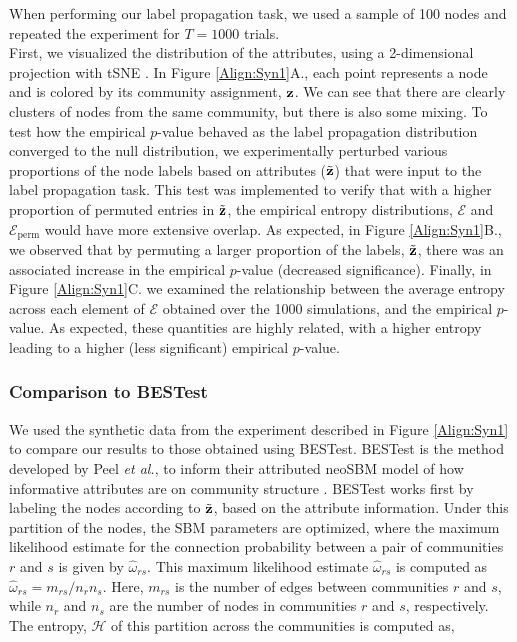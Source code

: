 When performing our label propagation task, we used a sample of 100 nodes and repeated the experiment for $T=1000$ trials. \\
\indent First, we visualized the distribution of the attributes, using a 2-dimensional projection with tSNE \cite{TwoD}. In Figure \ref{Align:Syn1}A., each point represents a node and is colored by its community assignment, ${\bf z}$. We can see that there are clearly clusters of nodes from the same community, but there is also some mixing. To test how the empirical $p$-value behaved as the label propagation distribution converged to the null distribution, we experimentally perturbed various proportions of the node labels based on attributes ($\tilde{\bf z}$) that were input to the label propagation task. This test was implemented to verify that with a higher proportion of permuted entries in $\tilde{\bf z}$, the empirical entropy distributions, $\mathcal{E}$ and $\mathcal{E}_{\text{perm}}$ would have more extensive overlap. As expected, in Figure \ref{Align:Syn1}B., we observed that by permuting a larger proportion of the labels, $\tilde{\bf z}$, there was an associated increase in the empirical $p$-value (decreased significance). Finally, in Figure \ref{Align:Syn1}C. we examined the relationship between the average entropy across each element of $\mathcal{E}$ obtained over the 1000 simulations, and the empirical $p$-value. As expected, these quantities are highly related, with a higher entropy leading to a higher (less significant) empirical $p$-value.


\subsubsection{Comparison to BESTest}
We used the synthetic data from the experiment described in Figure \ref{Align:Syn1} to compare our results to those obtained using BESTest. BESTest is the method developed by Peel \emph{et al.}, to inform their attributed neoSBM model of how informative attributes are on community structure \cite{peel2017ground}. BESTest works first by labeling the nodes according to $\tilde{\bf z}$, based on the attribute information. Under this partition of the nodes, the SBM parameters are optimized, where the maximum likelihood estimate for the connection probability between a pair of communities $r$ and $s$ is given by $\hat{\omega}_{rs}$. This maximum likelihood estimate $\hat{\omega}_{rs}$ is computed as $\hat{\omega}_{rs}=m_{rs}/n_{r}n_{s}$. Here, $m_{rs}$ is the number of edges between communities $r$ and $s$, while $n_{r}$ and $n_{s}$ are the number of nodes in communities $r$ and $s$, respectively. The entropy, $\mathcal{H}$ of this partition across the communities is computed as,

